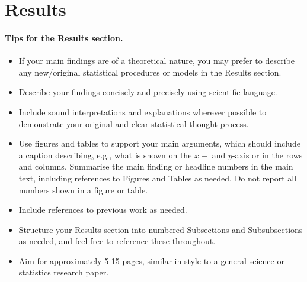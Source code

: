 \section{Results}

\paragraph{Tips for the Results section.} 

\begin{itemize}
    \item If your main findings are of a theoretical nature, you may prefer to describe any new/original statistical procedures or models in the Results section.
    \item Describe your findings concisely and precisely using scientific language. 
    \item Include sound interpretations and explanations wherever possible to demonstrate your original and clear statistical thought process. 
    \item Use figures and tables to support your main arguments, which should include a caption describing, e.g., what is shown on the $x-$ and $y$-axis or in the rows and columns. Summarise the main finding or headline numbers in the main text, including references to Figures and Tables as needed. Do not report all numbers shown in a figure or table.
    \item Include references to previous work as needed. 
    \item Structure your Results section into numbered Subsections and Subsubsections as needed, and feel free to reference these throughout.
    \item Aim for approximately 5-15 pages, similar in style to a general science or statistics research paper.
\end{itemize}
